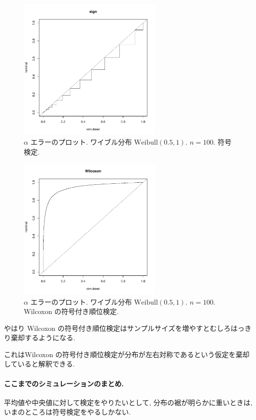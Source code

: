 \documentclass[12pt]{jsarticle}
\begin{document}
 \begin{figure}[htbp]
 \begin{center}
  \includegraphics[width=70mm]{img/pv_weibull_05_1_n100_sign.pdf}
 \end{center}
      \caption{$\alpha$ エラーのプロット. ワイブル分布 $\mathrm{Weibull}(0.5,1)$. $n=100$. 符号検定.}
     \end{figure}  

 \begin{figure}[htbp]
 \begin{center}
  \includegraphics[width=70mm]{img/pv_weibull_05_1_n100_wilco.pdf}
 \end{center}
       \caption{$\alpha$ エラーのプロット. ワイブル分布 $\mathrm{Weibull}(0.5,1)$. $n=100$. Wilcoxon の符号付き順位検定.}
  \label{fig_pv_weibull_05_1_100_wilco}
\end{figure}

やはり Wilcoxon の符号付き順位検定はサンプルサイズを増やすとむしろはっきり棄却するようになる.

これはWilcoxon の符号付き順位検定が分布が左右対称であるという仮定を棄却していると解釈できる.

\paragraph{ここまでのシミュレーションのまとめ.} 平均値や中央値に対して検定をやりたいとして, 分布の裾が明らかに重いときは, いまのところは符号検定をやるしかない. 
\end{document}
